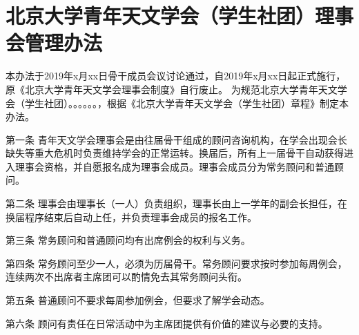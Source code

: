 \chapter{北京大学青年天文学会（学生社团）理事会管理办法}

本办法于2019年x月xx日骨干成员会议讨论通过，自2019年x月xx日起正式施行，原《北京大学青年天文学会理事会制度》自行废止。
为规范北京大学青年天文学会（学生社团）。。。。。。，根据《北京大学青年天文学会（学生社团）章程》制定本办法。

第一条  青年天文学会理事会是由往届骨干组成的顾问咨询机构，在学会出现会长缺失等重大危机时负责维持学会的正常运转。换届后，所有上一届骨干自动获得进入理事会资格，并自愿报名成为理事会成员。理事会成员分为常务顾问和普通顾问。

第二条  理事会由理事长（一人）负责组织，理事长由上一学年的副会长担任，在换届程序结束后自动上任，并负责理事会成员的报名工作。

第三条  常务顾问和普通顾问均有出席例会的权利与义务。

第四条  常务顾问至少一人，必须为历届骨干。常务顾问要求按时参加每周例会，连续两次不出席者主席团可以酌情免去其常务顾问头衔。

第五条  普通顾问不要求每周参加例会，但要求了解学会动态。

第六条  顾问有责任在日常活动中为主席团提供有价值的建议与必要的支持。
